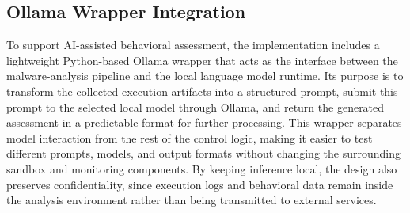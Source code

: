 \subsection{Ollama Wrapper Integration}

To support AI-assisted behavioral assessment, the implementation includes a lightweight Python-based Ollama wrapper that acts as the interface between the malware-analysis pipeline and the local language model runtime. Its purpose is to transform the collected execution artifacts into a structured prompt, submit this prompt to the selected local model through Ollama, and return the generated assessment in a predictable format for further processing. This wrapper separates model interaction from the rest of the control logic, making it easier to test different prompts, models, and output formats without changing the surrounding sandbox and monitoring components. By keeping inference local, the design also preserves confidentiality, since execution logs and behavioral data remain inside the analysis environment rather than being transmitted to external services.
